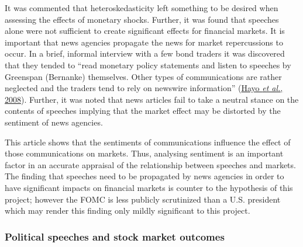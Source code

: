 \documentclass[11pt,preprint, authoryear]{elsarticle}
\numberwithin{equation}{section}
\numberwithin{figure}{section}
\numberwithin{table}{section}
\begin{document}
It was commented that heteroskedasticity left something to be desired
when assessing the effects of monetary shocks. Further, it was found
that speeches alone were not sufficient to create significant effects
for financial markets. It is important that news agencies propagate the
news for market repercussions to occur. In a brief, informal interview
with a few bond traders it was discovered that they tended to ``read
monetary policy statements and listen to speeches by Greenspan
(Bernanke) themselves. Other types of communications are rather
neglected and the traders tend to rely on newswire information''
(\protect\hyperlink{ref-hayo2008communicating}{Hayo \emph{et al.},
2008}). Further, it was noted that news articles fail to take a neutral
stance on the contents of speeches implying that the market effect may
be distorted by the sentiment of news agencies.

This article shows that the sentiments of communications influence the
effect of those communications on markets. Thus, analysing sentiment is
an important factor in an accurate appraisal of the relationship between
speeches and markets. The finding that speeches need to be propagated by
news agencies in order to have significant impacts on financial markets
is counter to the hypothesis of this project; however the FOMC is less
publicly scrutinized than a U.S. president which may render this finding
only mildly significant to this project.

\hypertarget{political-speeches-and-stock-market-outcomes}{%
\subsubsection{\texorpdfstring{Political speeches and stock market
outcomes
\label{Political speeches}}{Political speeches and stock market outcomes }}\label{political-speeches-and-stock-market-outcomes}}
\end{document}
